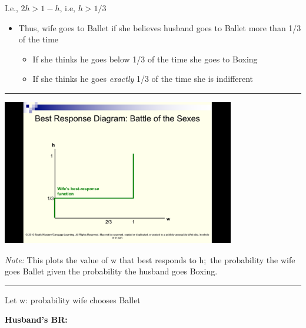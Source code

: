 \documentclass[]{article}
\providecommand{\tightlist}{%
  \setlength{\itemsep}{0pt}\setlength{\parskip}{0pt}}
\begin{document}
\bigskip

I.e., \(2h > 1- h\), i.e, \(h > 1/3\)

\begin{itemize}
\tightlist
\item
  Thus, wife goes to Ballet if she believes husband goes to Ballet more
  than 1/3 of the time

  \begin{itemize}
  \tightlist
  \item
    If she thinks he goes below 1/3 of the time she goes to Boxing
  \item
    If she thinks he goes \emph{exactly} 1/3 of the time she is
    indifferent
  \end{itemize}
\end{itemize}

\begin{center}\rule{0.5\linewidth}{\linethickness}\end{center}

\includegraphics[height=2.5in]{picsfigs/bosbr1.png}

\emph{Note:} This plots the value of w that best responds to h;~the
probability the wife goes Ballet given the probability the husband goes
Boxing.

\begin{center}\rule{0.5\linewidth}{\linethickness}\end{center}

Let w: probability wife chooses Ballet

\textbf{Husband's BR:}

\bigskip
\end{document}

